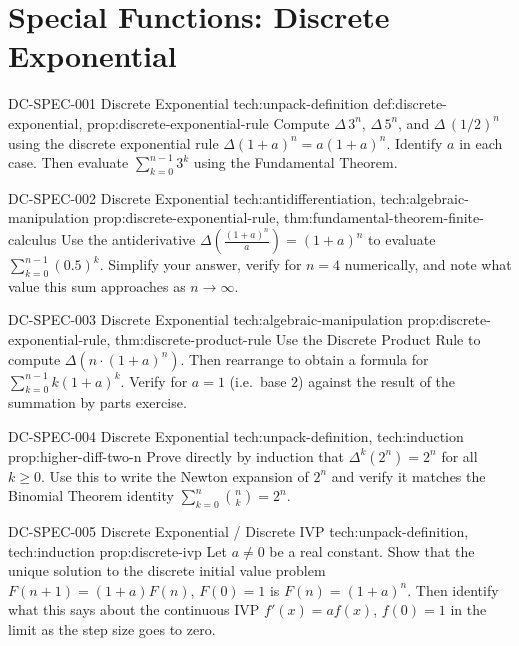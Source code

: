 \section*{Special Functions: Discrete Exponential}

\exstubgenfull
  {DC-SPEC-001}
  {Discrete Exponential}
  {tech:unpack-definition}
  {def:discrete-exponential, prop:discrete-exponential-rule}
  {Compute \(\Delta\,3^n\), \(\Delta\,5^n\), and \(\Delta\,(1/2)^n\)
  using the discrete exponential rule \(\Delta(1+a)^n = a(1+a)^n\).
  Identify \(a\) in each case. Then evaluate
  \(\displaystyle\sum_{k=0}^{n-1} 3^k\) using the Fundamental Theorem.}

\exstubgenfull
  {DC-SPEC-002}
  {Discrete Exponential}
  {tech:antidifferentiation, tech:algebraic-manipulation}
  {prop:discrete-exponential-rule, thm:fundamental-theorem-finite-calculus}
  {Use the antiderivative \(\Delta\!\left(\tfrac{(1+a)^n}{a}\right) = (1+a)^n\)
  to evaluate \(\displaystyle\sum_{k=0}^{n-1}(0.5)^k\). Simplify your
  answer, verify for \(n = 4\) numerically, and note what value this
  sum approaches as \(n \to \infty\).}

\exstubgenfull
  {DC-SPEC-003}
  {Discrete Exponential}
  {tech:algebraic-manipulation}
  {prop:discrete-exponential-rule, thm:discrete-product-rule}
  {Use the Discrete Product Rule to compute \(\Delta(n \cdot (1+a)^n)\).
  Then rearrange to obtain a formula for
  \(\displaystyle\sum_{k=0}^{n-1} k(1+a)^k\).
  Verify for \(a = 1\) (i.e.\ base \(2\)) against the result of
  the summation by parts exercise.}

\exstubgenfull
  {DC-SPEC-004}
  {Discrete Exponential}
  {tech:unpack-definition, tech:induction}
  {prop:higher-diff-two-n}
  {Prove directly by induction that \(\Delta^k(2^n) = 2^n\) for all
  \(k \ge 0\). Use this to write the Newton expansion of \(2^n\)
  and verify it matches the Binomial Theorem identity
  \(\sum_{k=0}^{n}\binom{n}{k} = 2^n\).}

\exstubgenfull
  {DC-SPEC-005}
  {Discrete Exponential / Discrete IVP}
  {tech:unpack-definition, tech:induction}
  {prop:discrete-ivp}
  {Let \(a \ne 0\) be a real constant. Show that the unique solution to
  the discrete initial value problem
  \(F(n+1) = (1+a)F(n)\), \(F(0) = 1\)
  is \(F(n) = (1+a)^n\). Then identify what this says about the
  continuous IVP \(f'(x) = af(x)\), \(f(0) = 1\) in the limit
  as the step size goes to zero.}

